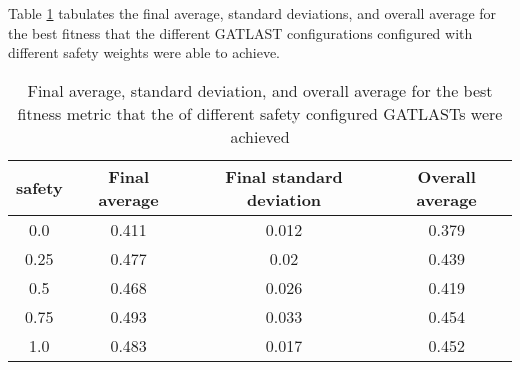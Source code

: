 Table \ref{tab:HP:GA:Safety:best fitness} tabulates the final average, standard deviations, and overall average for the best fitness that the different GATLAST configurations configured with different safety weights were able to achieve.
\begin{table}[tbh!]
\centering
\begin{adjustbox}{trim=0cm 0cm 0cm 0cm, clip=true}
\begin{tabular}{|c|c|c|c|}
\hline
safety & Final average & Final standard deviation & Overall average\\
\hline
0.0 & 0.411 & 0.012 & 0.379\\\hline
0.25 & 0.477 & 0.02 & 0.439\\\hline
0.5 & 0.468 & 0.026 & 0.419\\\hline
0.75 & 0.493 & 0.033 & 0.454\\\hline
1.0 & 0.483 & 0.017 & 0.452\\\hline
\end{tabular}
\end{adjustbox}
\caption{Final average, standard deviation, and overall average for the best fitness metric that the of different safety configured GATLASTs were achieved}
\label{tab:HP:GA:Safety:best fitness}
\end{table}